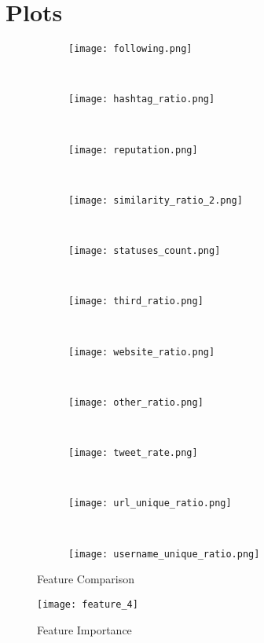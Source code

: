 \documentclass[a4paper, 12pt]{report}
\begin{document}
\newpage
\section*{Plots}
\begin{figure}[h!]
	\centering
	\begin{subfigure}[c]{0.3\linewidth}
		\texttt{[image: following.png]}
	\end{subfigure}
	~
	\begin{subfigure}[c]{0.3\linewidth}
		\texttt{[image: hashtag\_ratio.png]}
	\end{subfigure}
	~
	\begin{subfigure}[c]{0.3\linewidth}
		\texttt{[image: reputation.png]}
	\end{subfigure}
	~
	\begin{subfigure}[c]{0.3\linewidth}
		\texttt{[image: similarity\_ratio\_2.png]}
	\end{subfigure}
	~
	\begin{subfigure}[c]{0.3\linewidth}
	\texttt{[image: statuses\_count.png]}
	\end{subfigure}
	~
	\begin{subfigure}[c]{0.3\linewidth}
		\texttt{[image: third\_ratio.png]}
	\end{subfigure}
	~
	\begin{subfigure}[c]{0.3\linewidth}
		\texttt{[image: website\_ratio.png]}
	\end{subfigure}
	~
	\begin{subfigure}[c]{0.3\linewidth}
		\texttt{[image: other\_ratio.png]}
	\end{subfigure}
	~
	\begin{subfigure}[c]{0.3\linewidth}
		\texttt{[image: tweet\_rate.png]}
	\end{subfigure}
	~
	\begin{subfigure}[c]{0.3\linewidth}
		\texttt{[image: url\_unique\_ratio.png]}
	\end{subfigure}
	~
	\begin{subfigure}[c]{0.3\linewidth}
		\texttt{[image: username\_unique\_ratio.png]}
	\end{subfigure}
	\caption{Feature Comparison}
\end{figure}

\begin{figure}[h!]
	\centering
	\texttt{[image: feature\_4]}
	\caption{Feature Importance}
	\label{fig:mesh1}
\end{figure}
\end{document}
